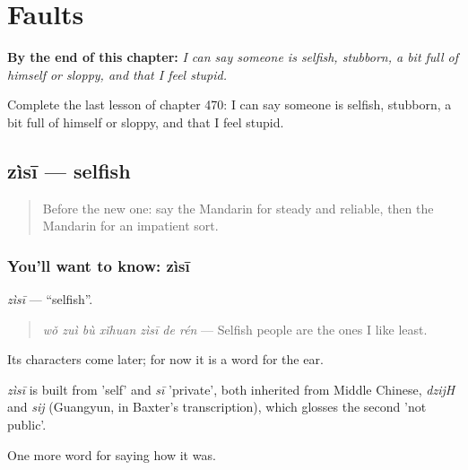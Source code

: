 
\chapter{Faults}
\label{ch:zh-faults}

\begin{chapteropening}
\textbf{By the end of this chapter:} \emph{I can say someone is selfish, stubborn, a bit full of himself or sloppy, and that I feel stupid.}

Complete the last lesson of chapter 470: I can say someone is selfish, stubborn, a bit full of himself or sloppy, and that I feel stupid.
\end{chapteropening}

\section[zìsī]{zìsī — selfish}

\label{lesson:ZH-C470-zisi}



\begin{quote}
Before the new one: say the Mandarin for steady and reliable, then the Mandarin for an impatient sort.
\end{quote}

\subsection*{You'll want to know: zìsī}
\emph{zìsī} — \textquotedblleft{}selfish\textquotedblright{}.

\begin{quote}
\emph{wǒ zuì bù xǐhuan zìsī de rén} — Selfish people are the ones I like least.
\end{quote}

Its characters come later; for now it is a word for the ear.

\begin{cousinweb}
\emph{zìsī} is built from  'self' and \emph{sī} 'private', both inherited from Middle Chinese, \emph{dzijH} and \emph{sij} (Guangyun, in Baxter's transcription), which glosses the second 'not public'.
\end{cousinweb}

\begin{grammarlens}[title={What you've built}]
One more word for saying how it was.
\end{grammarlens}

